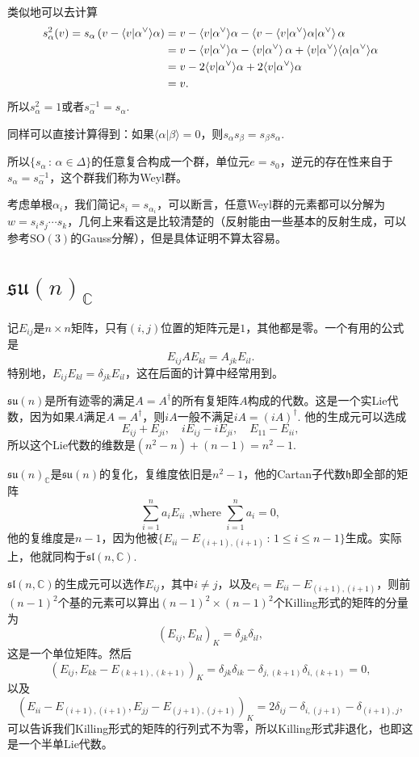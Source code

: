 \documentclass[9pt]{extarticle}
\newcommand{\cc}{\mathbb{C}}
\begin{document}
\para 类似地可以去计算
\begin{align*}
	s_\alpha^2(v)=s_\alpha\left(v-\langle v|\alpha^\vee\rangle\alpha\right)&=v-\langle v|\alpha^\vee\rangle\alpha-\left\langle v-\langle v|\alpha^\vee\rangle\alpha\large|\alpha^\vee\right\rangle\alpha\\
	&=v-\langle v|\alpha^\vee\rangle\alpha-\left\langle v\large|\alpha^\vee\right\rangle\alpha+\langle v|\alpha^\vee\rangle\langle\alpha|\alpha^\vee\rangle\alpha\\
	&=v-2\langle v|\alpha^\vee\rangle\alpha+2\langle v|\alpha^\vee\rangle\alpha\\
	&=v.
\end{align*}
所以$s_\alpha^2=1$或者$s_\alpha^{-1}=s_\alpha$.

同样可以直接计算得到：如果$\langle \alpha|\beta\rangle=0$，则$s_\alpha s_\beta=s_\beta s_\alpha$.

\para 所以$\{s_\alpha\,:\, \alpha\in \Delta\}$的任意复合构成一个群，单位元$e=s_0$，逆元的存在性来自于$s_\alpha=s_\alpha^{-1}$，这个群我们称为Weyl群。

考虑单根$\alpha_i$，我们简记$s_i=s_{\alpha_i}$，可以断言，任意Weyl群的元素都可以分解为$w=s_is_j\cdots s_k$，几何上来看这是比较清楚的（反射能由一些基本的反射生成，可以参考$\mathrm{SO}(3)$的Gauss分解），但是具体证明不算太容易。

\section{$\mathfrak{su}(n)_\cc$}

记$E_{ij}$是$n\times n$矩阵，只有$(i,j)$位置的矩阵元是$1$，其他都是零。一个有用的公式是
\[
	E_{ij}AE_{kl}=A_{jk}E_{il}.
\]
特别地，$E_{ij}E_{kl}=\delta_{jk}E_{il}$，这在后面的计算中经常用到。

\para $\mathfrak{su}(n)$是所有迹零的满足$A=A^\dag$的所有复矩阵$A$构成的代数。这是一个实Lie代数，因为如果$A$满足$A=A^\dag$，则$iA$一般不满足$iA=(iA)^\dag$. 他的生成元可以选成
\[
	E_{ij}+E_{ji},\quad iE_{ij}-iE_{ji},\quad E_{11}-E_{ii},
\]
所以这个Lie代数的维数是$(n^2-n)+(n-1)=n^2-1$.

\para $\mathfrak{su}(n)_\cc$是$\mathfrak{su}(n)$的复化，复维度依旧是$n^2-1$，他的Cartan子代数$\mathfrak{h}$即全部的矩阵
\[
	\sum_{i=1}^n a_i E_{ii} \text{ ,where } \sum_{i=1}^n  a_i=0,
\]
他的复维度是$n-1$，因为他被$\{E_{ii}-E_{(i+1),(i+1)}\,:\, 1\leq i \leq n-1\}$生成。实际上，他就同构于$\mathfrak{sl}(n,\cc)$.

$\mathfrak{sl}(n,\cc)$的生成元可以选作$E_{ij}$，其中$i\neq j$，以及$e_i=E_{ii}-E_{(i+1),(i+1)}$，则前$(n-1)^2$个基的元素可以算出$(n-1)^2\times (n-1)^2$个Killing形式的矩阵的分量为
\[
	(E_{ij},E_{kl})_K=\delta_{jk}\delta_{il},
\]
这是一个单位矩阵。然后
\[
	(E_{ij},E_{kk}-E_{(k+1),(k+1)})_K=\delta_{jk}\delta_{ik}-\delta_{j,(k+1)}\delta_{i,(k+1)}=0,
\]
以及
\[
	(E_{ii}-E_{(i+1),(i+1)},E_{jj}-E_{(j+1),(j+1)})_K=2\delta_{ij}-\delta_{i,(j+1)}-\delta_{(i+1),j},
\]
可以告诉我们Killing形式的矩阵的行列式不为零，所以Killing形式非退化，也即这是一个半单Lie代数。
\end{document}
